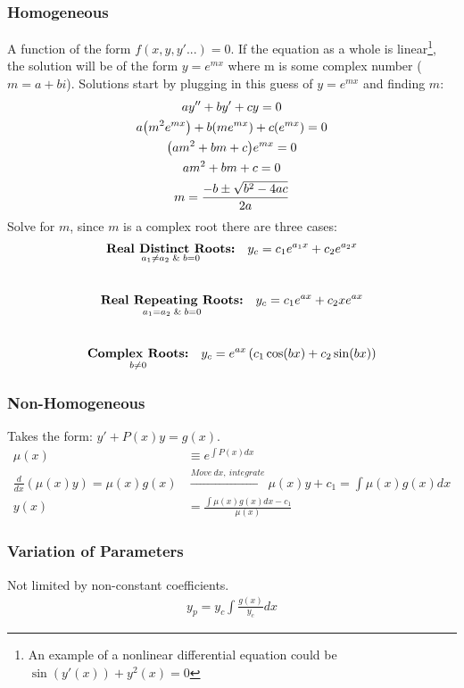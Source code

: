     \subsubsection{Homogeneous}
        A function of the form $f(x,y,y'...)=0$. If the equation as a whole is linear\footnote{An example of a nonlinear differential equation could be $\sin(y'(x))+y^2(x)=0$}, 
        the solution will be of the form \(y=e^{mx}\) where m is some complex number ($m=a+bi$). Solutions start by plugging in this guess of $y=e^{mx}$ and finding $m$:
        {
        \length[0.25 cm]
        \begin{gather*}
            ay''+by'+cy=0 
            \\
            a\qty(m^2e^{m x})+b \qty(m e^{m x})+c \qty(e^{m x})=0
            \\
            \qty(am^2+b m+c)e^{mx}=0
            \\
            am^2+b m+c=0
            \\
            m=\frac{-b\pm\sqrt{b^2-4ac}}{2a}
        \end{gather*}
        }
        Solve for $m$, since $m$ is a complex root there are three cases:
        \begin{gather}
            \underset { a_1 \neq a_2\And b=0 }{\textbf{Real Distinct Roots:}}\quad y_c=c_1e^{a_1x}+c_2e^{a_2x}\\[0.7 cm]
            \underset{a_1=a_2 \And b=0 }{\textbf{Real Repeating Roots:}}\quad y_c=c_1e^{ax}+c_2xe^{ax}\\[0.7 cm]
            \underset{b \neq 0}{\textbf{Complex Roots:}}\quad y_c=e^{ax}\left(c_1\cos(bx)+c_2\sin(bx)\right)
        \end{gather}
    \subsubsection{Non-Homogeneous}
        Takes the form: $y'+P(x)y=g(x)$. 
        \begin{align*}
            \mu(x)
            &\equiv e^{\int P(x) dx}\\
            \frac{d}{dx}(\mu(x)y)=\mu(x)g(x) 
            &\xrightarrow{Move\ dx,\ integrate} \mu(x)y +c_1=\int \mu(x) g(x)dx\\
            y(x)
            &=\frac{\int \mu(x) g(x)dx - c_1}{\mu(x)}
        \end{align*}

        \subsubsection*{Variation of Parameters}
        Not limited by non-constant coefficients. 
        \begin{align*}
            y_p=y_c\int{\frac{g(x)}{y_c}dx}
        \end{align*}    
